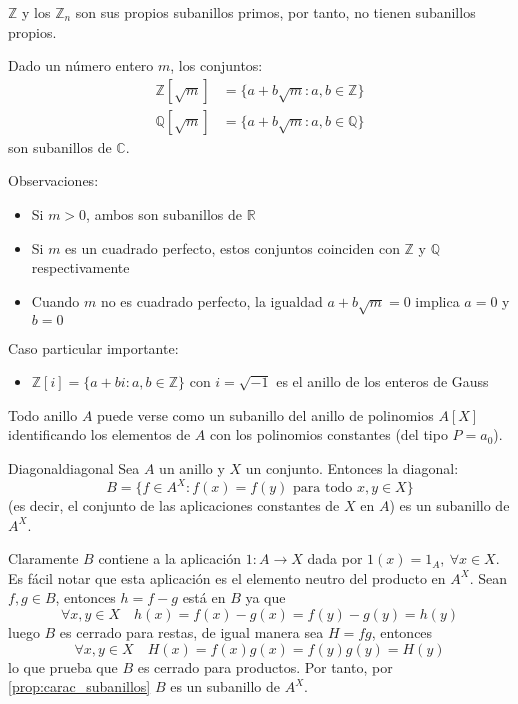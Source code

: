 \begin{remark}
    \(\mathbb{Z}\) y los \(\mathbb{Z}_n\) son sus propios subanillos primos, por tanto, no tienen subanillos propios.
\end{remark}

\begin{example}{}{}
    Dado un número entero \(m\), los conjuntos:
    \begin{align*}
        \mathbb{Z}[\sqrt{m}] &= \{a + b\sqrt{m} : a, b \in \mathbb{Z}\} \\
        \mathbb{Q}[\sqrt{m}] &= \{a + b\sqrt{m} : a, b \in \mathbb{Q}\}
    \end{align*}
    son subanillos de \(\mathbb{C}\).
    
    Observaciones:
    \begin{itemize}
        \item Si \(m > 0\), ambos son subanillos de \(\mathbb{R}\)
        \item Si \(m\) es un cuadrado perfecto, estos conjuntos coinciden con \(\mathbb{Z}\) y \(\mathbb{Q}\) respectivamente
        \item Cuando \(m\) no es cuadrado perfecto, la igualdad \(a + b\sqrt{m} = 0\) implica \(a = 0\) y \(b = 0\)
    \end{itemize}
    
    Caso particular importante:
    \begin{itemize}
        \item \(\mathbb{Z}[i] = \{a + bi : a, b \in \mathbb{Z}\}\) con \(i = \sqrt{-1}\) es el {anillo de los enteros de Gauss}
    \end{itemize}
\end{example}

\begin{example}{}{}
    Todo anillo \(A\) puede verse como un subanillo del anillo de polinomios \(A[X]\) identificando los elementos de \(A\) con los {polinomios constantes} (del tipo \(P = a_0\)).
\end{example}

\begin{example}{Diagonal}{diagonal}
    Sea \(A\) un anillo y \(X\) un conjunto. Entonces la {diagonal}:
    \[
    B = \{f \in A^X : f(x) = f(y) \text{ para todo } x, y \in X\}
    \]
    (es decir, el conjunto de las {aplicaciones constantes} de \(X\) en \(A\)) es un subanillo de \(A^X\).
\end{example}

\begin{proofbox}
    Claramente $B$ contiene a la aplicación $1 : A \to X$ dada por $1(x) = 1_A,\ \forall x \in X$. Es fácil notar que esta aplicación es el elemento neutro del producto en $A^X$. Sean $f,g \in B$, entonces $h = f - g$ está en $B$ ya que
    \[
    \forall x,y \in X \quad h(x)= f(x) - g(x) = f(y) - g(y) = h(y)
    \]
    luego $B$ es cerrado para restas, de igual manera sea $H = fg$, entonces
    \[
    \forall x,y \in X \quad H(x)= f(x)g(x) = f(y)g(y) = H(y)
    \]
    lo que prueba que $B$ es cerrado para productos. Por tanto, por \ref{prop:carac_subanillos} $B$ es un subanillo de $A^X$.
\end{proofbox}

